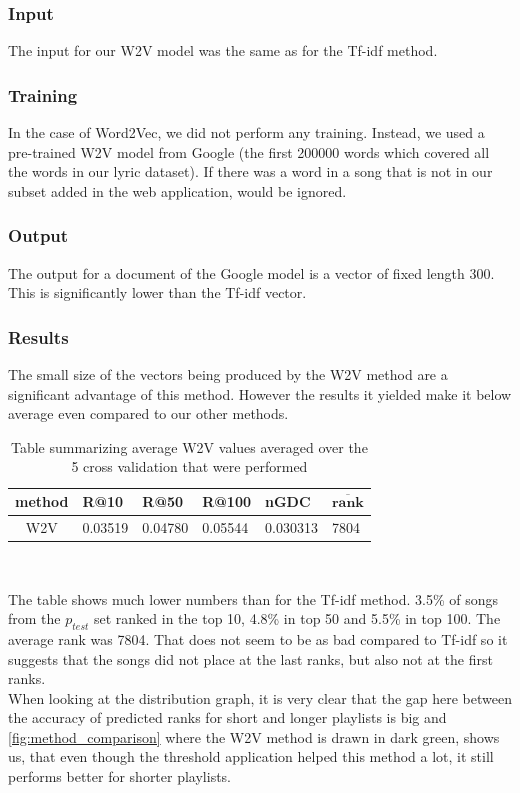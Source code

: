\subsubsection{Input}
The input for our W2V model was the same as for the Tf-idf method.

\subsubsection{Training}
In the case of Word2Vec, we did not perform any training. Instead, we used a pre-trained W2V model from Google (the first 200000 words which covered all the words in our lyric dataset). If there was a word in a song that is not in our subset added in the web application, would be ignored.

\subsubsection{Output}
The output for a document of the Google model is a vector of fixed length 300. This is significantly lower than the Tf-idf vector.

\subsubsection{Results}
The small size of the vectors being produced by the W2V method are a significant advantage of this method. However the results it yielded make it below average even compared to our other methods.

\begin{table}[h]
\centering
\renewcommand{\arraystretch}{1.5}
\begin{tabu} to 1\textwidth { | c || X[c] | X[c] | X[c] | X[c] | X[c] |}
 \hline
 \textbf{method} & \textbf{R@10} & \textbf{R@50} & \textbf{R@100} & \textbf{nGDC} & $ \boldsymbol{\overline{rank}} $ \\
 \hline
 \hline
 W2V & 0.03519 & 0.04780 & 0.05544 & 0.030313 & 7804 \\
 \hline
\end{tabu} \\
\caption{Table summarizing average W2V values averaged over the 5 cross validation that were performed}
\label{table:2}
\end{table}

The table shows much lower numbers than for the Tf-idf method. 3.5\% of songs from the $ p_{test} $ set ranked in the top 10, 4.8\% in top 50 and 5.5\% in top 100. The average rank was 7804. That does not seem to be as bad compared to Tf-idf so it suggests that the songs did not place at the last ranks, but also not at the first ranks. \\
When looking at the distribution graph, it is very clear that the gap here between the accuracy of predicted ranks for short and longer playlists is big and \ref{fig:method_comparison} where the W2V method is drawn in dark green, shows us, that even though the threshold application helped this method a lot, it still performs better for shorter playlists. 

